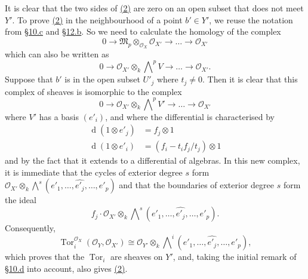 \documentclass{article}
\newcommand{\scr}[1]{{\mathscr{#1}}}
\newcommand{\dd}{\operatorname{d}\!}
\DeclareMathOperator{\Tor}{Tor}
\begin{document}
It is clear that the two sides of \hyperref[section15equation2]{(2)} are zero on an open subset that does not meet $Y'$.
To prove \hyperref[section15equation2]{(2)} in the neighbourhood of a point $b'\in Y'$, we reuse the notation from \hyperref[subsection10c]{\S10.c} and \hyperref[subsection12b]{\S12.b}.
So we need to calculate the homology of the complex
\[
  0 \to \mathfrak{M}_p\otimes_{\scr{O}_X}\scr{O}_{X'} \to \ldots \to \scr{O}_{X'}
\]
which can also be written as
\[
  0 \to \scr{O}_{X'}\otimes_k\bigwedge\nolimits^p V \to \ldots \to \scr{O}_{X'}.
\]
Suppose that $b'$ is in the open subset $U'_j$ where $t_j\neq0$.
Then it is clear that this complex of sheaves is isomorphic to the complex
\[
  0 \to \scr{O}_{X'}\otimes_k\bigwedge\nolimits^p V' \to \ldots \to \scr{O}_{X'}
\]
where $V'$ has a basis $(e'_i)$, and where the differential is characterised by
\begin{align*}
  \dd(1\otimes e'_j) &= f_j\otimes1
\\\dd(1\otimes e'_i) &= (f_i-t_if_j/t_j)\otimes1
\end{align*}
and by the fact that it extends to a differential of algebras.
In this new complex, it is immediate that the cycles of exterior degree $s$ form $\scr{O}_{X'}\otimes_k\bigwedge\nolimits^s(e'_1,\ldots,\widehat{e'_j},\ldots,e'_p)$ and that the boundaries of exterior degree $s$ form the ideal
\[
  f_j\cdot\scr{O}_{X'}\otimes_k\bigwedge\nolimits^s(e'_1,\ldots,\widehat{e'_j},\ldots,e'_p).
\]
Consequently,
\[
  \Tor_i^{\scr{O}_X}(\scr{O}_Y,\scr{O}_{X'})
  \cong
  \scr{O}_{Y'}\otimes_k\bigwedge\nolimits^i(e'_1,\ldots,\widehat{e'_j},\ldots,e'_p),
\]
which proves that the $\Tor_i$ are sheaves on $Y'$, and, taking the initial remark of \hyperref[subsection10d]{\S10.d} into account, also gives \hyperref[section15equation2]{(2)}.
\end{document}
